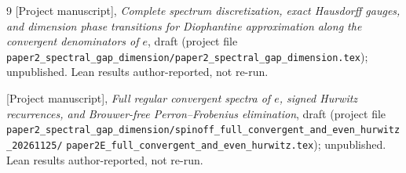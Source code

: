 \documentclass[11pt]{amsart}
\theoremstyle{definition}
\theoremstyle{remark}
\begin{document}
\begin{thebibliography}{9}
 [Project manuscript], \emph{Complete spectrum discretization, exact Hausdorff gauges, and dimension
phase transitions for Diophantine approximation along the convergent denominators of $e$}, draft
(project file \texttt{paper2\_spectral\_gap\_dimension/paper2\_spectral\_gap\_dimension.tex}); unpublished.
Lean results author-reported, not re-run.

 [Project manuscript], \emph{Full regular convergent spectra of $e$, signed Hurwitz recurrences, and
Brouwer-free Perron--Frobenius elimination}, draft (project file
\texttt{paper2\_spectral\_gap\_dimension/spinoff\_full\_convergent\_and\_even\_hurwitz\_20261125/}
\texttt{paper2E\_full\_convergent\_and\_even\_hurwitz.tex}); unpublished. Lean results author-reported, not re-run.


\end{thebibliography}
\end{document}
